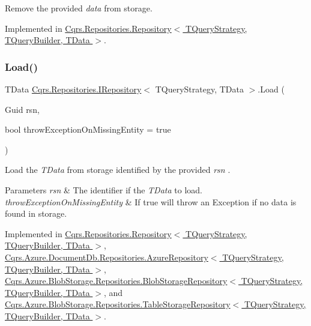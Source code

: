 Remove the provided {\itshape data}  from storage. 



Implemented in \hyperlink{classCqrs_1_1Repositories_1_1Repository_a6ed69cb5542164d9de81b0fa8a549d3e_a6ed69cb5542164d9de81b0fa8a549d3e}{Cqrs.\+Repositories.\+Repository$<$ T\+Query\+Strategy, T\+Query\+Builder, T\+Data $>$}.

\mbox{\label{interfaceCqrs_1_1Repositories_1_1IRepository_ae545451c48d1e2b5693db73e169e100d_ae545451c48d1e2b5693db73e169e100d}} 
\subsubsection{\texorpdfstring{Load()}{Load()}}
{\footnotesize\ttfamily T\+Data \hyperlink{interfaceCqrs_1_1Repositories_1_1IRepository}{Cqrs.\+Repositories.\+I\+Repository}$<$ T\+Query\+Strategy, T\+Data $>$.Load (\begin{DoxyParamCaption}\item[{Guid}]{rsn,  }\item[{bool}]{throw\+Exception\+On\+Missing\+Entity = {\ttfamily true} }\end{DoxyParamCaption})}



Load the {\itshape T\+Data}  from storage identified by the provided {\itshape rsn} . 


\begin{DoxyParams}{Parameters}
{\em rsn} & The identifier if the {\itshape T\+Data}  to load.\\
\hline
{\em throw\+Exception\+On\+Missing\+Entity} & If true will throw an Exception if no data is found in storage.\\
\hline
\end{DoxyParams}


Implemented in \hyperlink{classCqrs_1_1Repositories_1_1Repository_a444e9dfe4710be90940dbb6dec9d856f_a444e9dfe4710be90940dbb6dec9d856f}{Cqrs.\+Repositories.\+Repository$<$ T\+Query\+Strategy, T\+Query\+Builder, T\+Data $>$}, \hyperlink{classCqrs_1_1Azure_1_1DocumentDb_1_1Repositories_1_1AzureRepository_a22c58163e101a6cb80f891bed6114380_a22c58163e101a6cb80f891bed6114380}{Cqrs.\+Azure.\+Document\+Db.\+Repositories.\+Azure\+Repository$<$ T\+Query\+Strategy, T\+Query\+Builder, T\+Data $>$}, \hyperlink{classCqrs_1_1Azure_1_1BlobStorage_1_1Repositories_1_1BlobStorageRepository_a7c5a3ca4d92cf4954508fb3e583eb49e_a7c5a3ca4d92cf4954508fb3e583eb49e}{Cqrs.\+Azure.\+Blob\+Storage.\+Repositories.\+Blob\+Storage\+Repository$<$ T\+Query\+Strategy, T\+Query\+Builder, T\+Data $>$}, and \hyperlink{classCqrs_1_1Azure_1_1BlobStorage_1_1Repositories_1_1TableStorageRepository_a7238452f19c9d51b5733df7701920605_a7238452f19c9d51b5733df7701920605}{Cqrs.\+Azure.\+Blob\+Storage.\+Repositories.\+Table\+Storage\+Repository$<$ T\+Query\+Strategy, T\+Query\+Builder, T\+Data $>$}.

